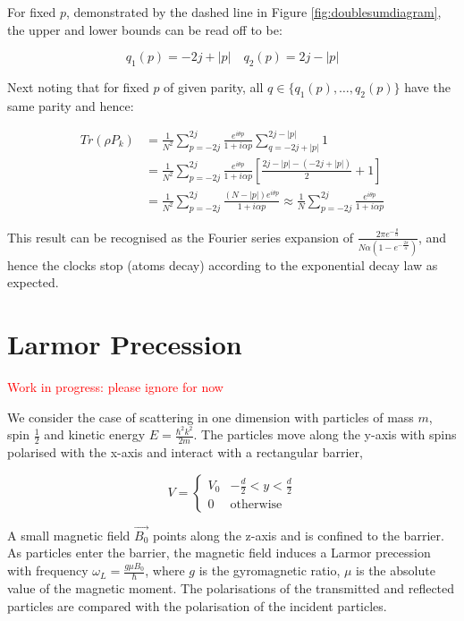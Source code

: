 \documentclass{article}
\begin{document}
\noindent For fixed $p$, demonstrated by the dashed line in Figure \ref{fig:doublesumdiagram}, the upper and lower bounds can be read off to be:

\begin{equation}
	q_1(p)=-2j+|p| \quad q_2(p)=2j-|p|
\end{equation}

\noindent Next noting that for fixed $p$ of given parity, all $q \in \{q_1(p),\dots,q_2(p)\}$ have the same parity and hence:

\begin{align}
	Tr(\rho P_k) &= \frac{1}{N^2}\sum_{p=-2j}^{2j}\frac{e^{i\theta p}}{1+i\alpha p}\sum_{q=-2j+|p|}^{2j-|p|}1 \\
		     &= \frac{1}{N^2}\sum_{p=-2j}^{2j}\frac{e^{i\theta p}}{1+i\alpha p}\left[\frac{2j-|p|-(-2j+|p|)}{2}+1\right] \\
		     &= \frac{1}{N^2}\sum_{p=-2j}^{2j}\frac{(N-|p|)e^{i\theta p}}{1+i\alpha p} \approx \frac{1}{N}\sum_{p=-2j}^{2j}\frac{e^{i\theta p}}{1+i\alpha p}
\end{align}

\noindent This result can be recognised as the Fourier series expansion of $\frac{2\pi e^{-\frac{\theta}{\alpha}}}{N\alpha\left(1-e^{-\frac{2\pi}{\alpha}}\right)}$, and hence the clocks stop (atoms decay) according to the exponential decay law as expected.

\section{Larmor Precession}

\noindent \textcolor{red}{Work in progress: please ignore for now}

We consider the case of scattering in one dimension with particles of mass $m$, spin $\frac{1}{2}$ and kinetic energy $
E = \frac{\hbar^2k^2}{2m}$. The particles move along the y-axis with spins polarised with the x-axis and interact with a rectangular barrier,

\begin{equation}
	V = 
	\begin{cases}
	V_0 & -\frac{d}{2}<y<\frac{d}{2}\\
		0 & \text{otherwise}
	\end{cases}
\end{equation}

A small magnetic field $\vec{B_{0}}$ points along the z-axis and is confined to the barrier. As particles enter the barrier, the magnetic field induces a Larmor precession with frequency $\omega_{L}=\frac{g \mu B_{0}}{\hbar}$, where $g$ is the gyromagnetic ratio, $\mu$ is the absolute value of the magnetic moment. The polarisations of the transmitted and reflected particles are compared with the polarisation of the incident particles.
\end{document}
